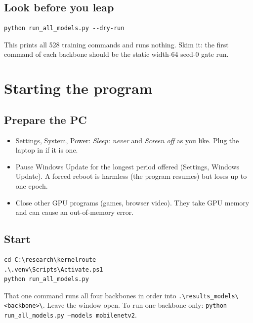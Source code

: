 \documentclass[10.5pt,a4paper]{article}
\newcommand{\cmd}[1]{\texttt{#1}}
\begin{document}
\subsection{Look before you leap}
\begin{lstlisting}
python run_all_models.py --dry-run
\end{lstlisting}
This prints all 528 training commands and runs nothing. Skim it: the first command of each backbone should be the static width-64 seed-0 gate run.

\section{Starting the program}\label{sec:run}

\subsection{Prepare the PC}
\begin{itemize}
\item Settings, System, Power: \emph{Sleep: never} and \emph{Screen off} as you like. Plug the laptop in if it is one.
\item Pause Windows Update for the longest period offered (Settings, Windows Update). A forced reboot is harmless (the program resumes) but loses up to one epoch.
\item Close other GPU programs (games, browser video). They take GPU memory and can cause an out-of-memory error.
\end{itemize}

\subsection{Start}
\begin{lstlisting}
cd C:\research\kernelroute
.\.venv\Scripts\Activate.ps1
python run_all_models.py
\end{lstlisting}
That one command runs all four backbones in order into \cmd{.\textbackslash results\_models\textbackslash <backbone>\textbackslash}. Leave the window open. To run one backbone only: \cmd{python run\_all\_models.py --models mobilenetv2}.
\end{document}
